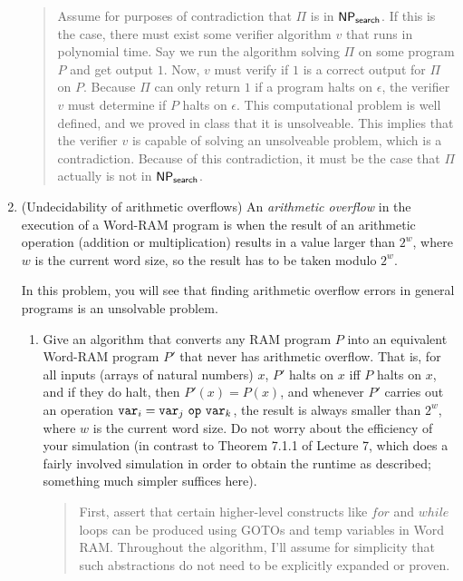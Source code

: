 \documentclass[11pt]{article}
\begin{document}
\begin{enumerate}
\begin{quote}
        Assume for purposes of contradiction that $\Pi$ is in $\mathsf{NP_{search}}$. If this is the case, there must exist some verifier algorithm $v$ that runs in polynomial time. Say we run the algorithm solving $\Pi$ on some program $P$ and get output $1$. Now, $v$ must verify if $1$ is a correct output for $\Pi$ on $P$. Because $\Pi$ can only return $1$ if a program halts on $\epsilon$, the verifier $v$ must determine if $P$ halts on $\epsilon$. This computational problem is well defined, and we proved in class that it is unsolveable. This implies that the verifier $v$ is capable of solving an unsolveable problem, which is a contradiction. Because of this contradiction, it must be the case that $\Pi$ actually is not in $\mathsf{NP_{search}}$. \\
    \end{quote}

  \item (Undecidability of arithmetic overflows) An {\em arithmetic overflow} in the execution of a Word-RAM program is when the result of an arithmetic operation (addition or multiplication) results in a value larger than $2^w$, where $w$ is the current word size, so the result has to be taken modulo $2^w$. 

  
  In this problem, you will see that finding arithmetic overflow errors in general programs is an unsolvable problem.

  \begin{enumerate}
      \item Give an algorithm that converts any RAM program $P$ into an equivalent Word-RAM program $P'$ that never has arithmetic overflow.  That is, for all inputs (arrays of natural numbers) $x$, $P'$ halts on $x$ iff $P$ halts on $x$, and if they do halt, then $P'(x)=P(x)$, and whenever $P'$ carries out an operation $\var_i = \var_j\ \op\ \var_k$, the result is always smaller than $2^w$, where $w$ is the current word size.  Do not worry about the efficiency of your simulation (in contrast to Theorem 7.1.1 of Lecture 7, which does a fairly involved simulation in order to obtain the runtime as described; something much simpler suffices here).

      \begin{quote}
          \color{purple}
          First, assert that certain higher-level constructs like $for$ and $while$ loops can be produced using GOTOs and temp variables in Word RAM. Throughout the algorithm, I'll assume for simplicity that such abstractions do not need to be explicitly expanded or proven. \\


\end{quote}
\end{enumerate}
\end{enumerate}
\end{document}
